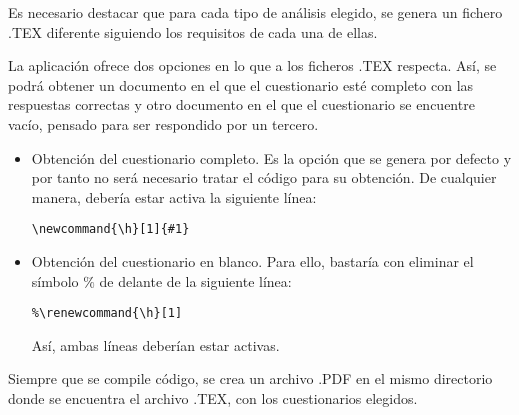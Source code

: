 
Es necesario destacar que para cada tipo de análisis elegido, se genera un fichero .TEX diferente siguiendo los requisitos de cada una de ellas. 

La aplicación ofrece dos opciones en lo que a los ficheros .TEX respecta. Así, se podrá obtener un documento en el que el cuestionario esté completo con las respuestas correctas y otro documento en el que el cuestionario se encuentre vacío, pensado para ser respondido por un tercero.

\begin{itemize}
\item Obtención del cuestionario completo. Es la opción que se genera por defecto y por tanto no será necesario tratar el código para su obtención. De cualquier manera, debería estar activa la siguiente línea:
\begin{verbatim}
\newcommand{\h}[1]{#1}
\end{verbatim}
\item Obtención del cuestionario en blanco. Para ello, bastaría con eliminar el símbolo $\%$ de delante de la siguiente línea:

\begin{verbatim}
%\renewcommand{\h}[1]
\end{verbatim}

Así, ambas líneas deberían estar activas.

\end{itemize}

Siempre que se compile código, se crea un archivo .PDF en el mismo directorio donde se encuentra el archivo .TEX, con los cuestionarios elegidos.
